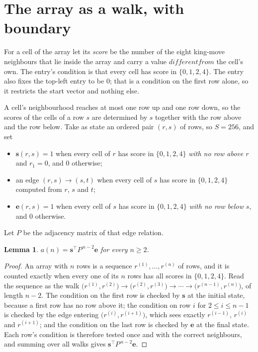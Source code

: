 \documentclass[11pt,a4paper]{article}
\theoremstyle{plain}
\newtheorem{lemma}[theorem]{Lemma}
\theoremstyle{definition}
\begin{document}
\section{The array as a walk, with boundary}

For a cell of the array let its \emph{score} be the number of the eight king-move neighbours that lie inside
the array and carry a value $different from$ the cell's own. The entry's condition is that every cell
has score in $\{0,1,2,4\}$. The entry also fixes the top-left entry to be $0$; that is a condition on the first row alone, so it restricts the start vector and nothing else.

A cell's neighbourhood reaches at most one row up and one row down, so the scores of the
cells of a row $s$ are determined by $s$ together with the row above and the row below.
Take as state an ordered pair $(r,s)$ of rows, so $S=256$, and set
\begin{itemize}
\item $\mathbf{s}(r,s)=1$ when every cell of $r$ has score in $\{0,1,2,4\}$ \emph{with no row
above $r$} and $r_1=0$, and $0$ otherwise;
\item an edge $(r,s)\to(s,t)$ when every cell of $s$ has score in $\{0,1,2,4\}$ computed from
$r$, $s$ and $t$;
\item $\mathbf{e}(r,s)=1$ when every cell of $s$ has score in $\{0,1,2,4\}$ \emph{with no row
below $s$}, and $0$ otherwise.
\end{itemize}
Let $P$ be the adjacency matrix of that edge relation.

\begin{lemma}\label{lem:walk}
$a(n)=\mathbf{s}^{\!\top}P^{\,n-2}\mathbf{e}$ for every $n\ge2$.
\end{lemma}

\begin{proof}
An array with $n$ rows is a sequence $r^{(1)},\dots,r^{(n)}$ of rows, and it is counted
exactly when every one of its $n$ rows has all scores in $\{0,1,2,4\}$. Read the sequence as the
walk $\bigl(r^{(1)},r^{(2)}\bigr)\to\bigl(r^{(2)},r^{(3)}\bigr)\to\cdots\to
\bigl(r^{(n-1)},r^{(n)}\bigr)$, of length $n-2$. The condition on the first row is
checked by $\mathbf{s}$ at the initial state, because a first row has no row above it; the
condition on row $i$ for $2\le i\le n-1$ is checked by the edge entering
$\bigl(r^{(i)},r^{(i+1)}\bigr)$, which sees exactly $r^{(i-1)}$, $r^{(i)}$ and
$r^{(i+1)}$; and the condition on the last row is checked by $\mathbf{e}$ at the final
state. Each row's condition is therefore tested once and with the correct neighbours, and
summing over all walks gives $\mathbf{s}^{\!\top}P^{\,n-2}\mathbf{e}$.
\end{proof}
\end{document}

